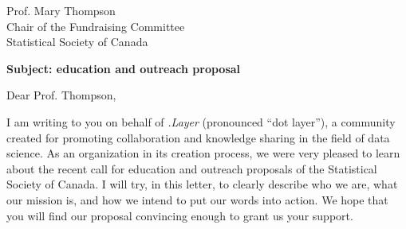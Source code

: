\documentclass[11pt, a4paper]{letter} %
\begin{document}

\begin{letter}{
	Prof. Mary Thompson\\
	Chair of the Fundraising Committee\\
	Statistical Society of Canada
	
	\bigskip
	\textbf{Subject: education and outreach proposal}%
}



\opening{Dear Prof. Thompson,}

%

I am writing to you on behalf of \textit{.Layer} (pronounced ``dot layer''), a community created for promoting collaboration and knowledge sharing in the field of data science. As an organization in its creation process, we were very pleased to learn about the recent call for education and outreach proposals of the Statistical Society of Canada. I will try, in this letter, to clearly describe who we are, what our mission is, and how we intend to put our words into action. We hope that you will find our proposal convincing enough to grant us your support.

%
%   



\end{letter}
\end{document}
